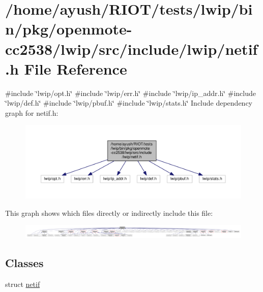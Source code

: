 \hypertarget{openmote-cc2538_2lwip_2src_2include_2lwip_2netif_8h}{}\section{/home/ayush/\+R\+I\+O\+T/tests/lwip/bin/pkg/openmote-\/cc2538/lwip/src/include/lwip/netif.h File Reference}
\label{openmote-cc2538_2lwip_2src_2include_2lwip_2netif_8h}
{\ttfamily \#include \char`\"{}lwip/opt.\+h\char`\"{}}\newline
{\ttfamily \#include \char`\"{}lwip/err.\+h\char`\"{}}\newline
{\ttfamily \#include \char`\"{}lwip/ip\+\_\+addr.\+h\char`\"{}}\newline
{\ttfamily \#include \char`\"{}lwip/def.\+h\char`\"{}}\newline
{\ttfamily \#include \char`\"{}lwip/pbuf.\+h\char`\"{}}\newline
{\ttfamily \#include \char`\"{}lwip/stats.\+h\char`\"{}}\newline
Include dependency graph for netif.\+h\+:
\nopagebreak
\begin{figure}[H]
\begin{center}
\leavevmode
\includegraphics[width=350pt]{openmote-cc2538_2lwip_2src_2include_2lwip_2netif_8h__incl}
\end{center}
\end{figure}
This graph shows which files directly or indirectly include this file\+:
\nopagebreak
\begin{figure}[H]
\begin{center}
\leavevmode
\includegraphics[width=350pt]{openmote-cc2538_2lwip_2src_2include_2lwip_2netif_8h__dep__incl}
\end{center}
\end{figure}
\subsection*{Classes}
\begin{DoxyCompactItemize}
\item 
struct \hyperlink{structnetif}{netif}
\end{DoxyCompactItemize}
